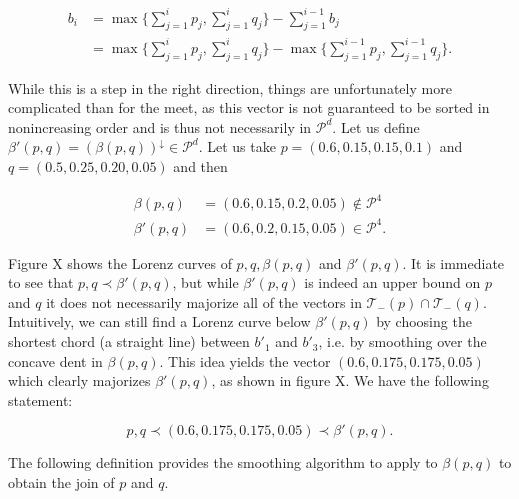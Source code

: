 \begin{align}
    b_i &= \max \Big\{ \sum_{j=1}^{i} p_j , \sum_{j=1}^{i} q_j \Big\} - \sum_{j=1}^{i-1} b_j \label{eq:beta_bis} \\
    &= \max \Big\{ \sum_{j=1}^{i} p_j , \sum_{j=1}^{i} q_j \Big\} - \max \Big\{ \sum_{j=1}^{i-1} p_j , \sum_{j=1}^{i-1} q_j \Big\}. \label{eq:beta}
\end{align}

While this is a step in the right direction, things are unfortunately more complicated than for the meet, as this vector is not guaranteed to be sorted in nonincreasing order and is thus not necessarily in $\mathcal{P}^d$. Let us define $\beta'(p, q) = (\beta(p, q))^\downarrow \in \mathcal{P}^d$. Let us take $p = (0.6, 0.15, 0.15, 0.1)$ and $q = (0.5, 0.25, 0.20, 0.05)$ and then

\begin{align}
    \beta(p, q) &= (0.6, 0.15, 0.2, 0.05) \notin \mathcal{P}^4 \\
    \beta'(p, q) &= (0.6, 0.2, 0.15, 0.05) \in \mathcal{P}^4.
\end{align}

Figure X shows the Lorenz curves of $p, q, \beta(p, q)$ and $\beta'(p, q)$. It is immediate to see that $p, q \prec \beta'(p, q)$, but while $\beta'(p, q)$  is indeed an upper bound on $p$ and $q$ it does not necessarily majorize all of the vectors in $\mathcal{T}_-(p) \cap \mathcal{T}_-(q)$. Intuitively, we can still find a Lorenz curve below $\beta'(p, q)$ by choosing the shortest chord (a straight line) between $b'_1$ and $b'_3$, i.e. by smoothing over the concave dent in $\beta(p, q)$. This idea yields the vector $(0.6, 0.175, 0.175, 0.05)$ which clearly majorizes $\beta'(p, q)$, as shown in figure X. We have the following statement:

\begin{equation}
    p, q \prec (0.6, 0.175, 0.175, 0.05) \prec \beta'(p, q).
\end{equation}

The following definition provides the smoothing algorithm to apply to $\beta(p, q)$ to obtain the join of $p$ and $q$.

